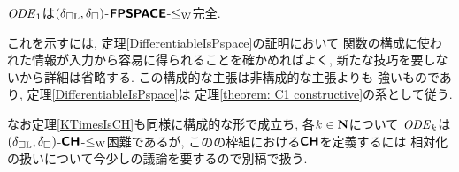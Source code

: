 \begin{theorem}
\label{theorem: C1 constructive}
$\mathit{ODE} _1$は$(\delta _{\square \mathrm L}, \delta _\square)$-$\text{\bfseries \sffamily \upshape FPSPACE}$-$\leq _{\mathrm W}$完全. 
\end{theorem}

これを示すには, 
定理\ref{DifferentiableIsPspace}の証明において
関数の構成に使われた情報が入力から容易に得られることを確かめればよく, 
新たな技巧を要しないから詳細は省略する. 
この構成的な主張は非構成的な主張よりも
強いものであり\cite[補題3.7, 3.8]{kawamura2010operators}, 
定理\ref{DifferentiableIsPspace}は
定理\ref{theorem: C1 constructive}の系として従う. 


なお定理\ref{KTimesIsCH}も同様に構成的な形で成立ち, 
各$k \in \mathbf N$について
$\mathit{ODE} _k$は$(\delta _{\square \mathrm L}, \delta _\square)$-$\text{\bfseries \sffamily \upshape CH}$-$\leq _{\mathrm W}$困難であるが, 
この\cite{kawamura2010operators}の枠組における$\text{\bfseries \sffamily \upshape CH}$を定義するには
相対化の扱いについて今少しの議論を要するので別稿で扱う. 


